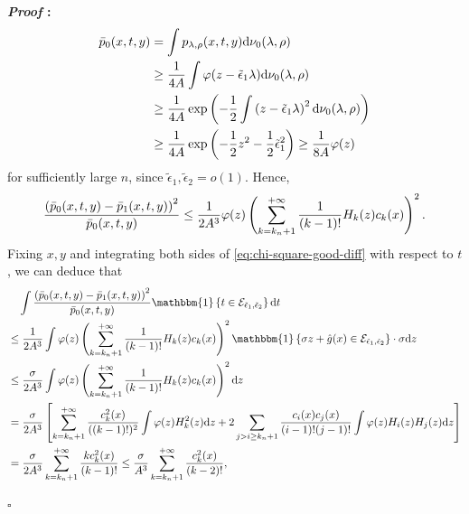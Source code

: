 \documentclass{article}
\def\eps{{\epsilon}}
\def\gE{{\mathcal{E}}}
\newcommand{\dd}{\textup{d}}
\renewenvironment{proof}{\noindent\textbf{\textit{Proof }:}}{\hfill$\square$}
\begin{document}
\begin{proof}
\begin{equation}
        \begin{aligned}
            \bar{p}_0(x,t,y) &= \int 
            p_{\lambda,\rho}(x,t,y) \dd \nu_0(\lambda,\rho) \\
            &\geq \frac{1}{4A} \int \varphi(z-\tilde{\eps}_1\lambda) \dd \nu_0(\lambda,\rho) \\
            &\geq \frac{1}{4A}\exp\left(-\frac{1}{2}\int \left(z-\tilde{\eps}_1\lambda\right)^2 \dd \nu_0(\lambda,\rho)\right) \\
            &\geq \frac{1}{4A}\exp\left(-\frac{1}{2}z^2-\frac{1}{2}\tilde{\eps}_1^2\right) \geq \frac{1}{8A}\varphi(z)
        \end{aligned}
    \end{equation}
    for sufficiently large $n$, since $\tilde{\eps}_1,\tilde{\eps}_2=o(1)$. Hence,
    \begin{equation}
        \notag
        \frac{\left(\bar{p}_0(x,t,y)-\bar{p}_1(x,t,y)\right)^2}{\bar{p}_0(x,t,y)} \leq \frac{1}{2A^3}\varphi(z)\left(\sum_{k=k_n+1}^{+\infty}\frac{1}{(k-1)!}H_k(z)c_k(x)\right)^2.
    \end{equation}
    Fixing $x,y$ and integrating both sides of \eqref{eq:chi-square-good-diff} with respect to $t$, we can deduce that
    \begin{equation}
        \label{eq:chi-square-integrate-t}
        \begin{aligned}
            &\quad \int \frac{\left(\bar{p}_0(x,t,y)-\bar{p}_1(x,t,y)\right)^2}{\bar{p}_0(x,t,y)} \mathbbm{1}\left\{t\in\gE_{\tilde{\eps}_1,\tilde{\eps}_2}\right\} \dd t \\
            &\leq \frac{1}{2A^3} \int \varphi(z) \left(\sum_{k=k_n+1}^{+\infty}\frac{1}{(k-1)!}H_k(z)c_k(x)\right)^2\mathbbm{1}\left\{\sigma z + \hat{g}(x) \in\gE_{\tilde{\eps}_1,\tilde{\eps}_2}\right\}\cdot \sigma\dd z \\
            &\leq \frac{\sigma}{2A^3} \int \varphi(z) \left(\sum_{k=k_n+1}^{+\infty}\frac{1}{(k-1)!}H_k(z)c_k(x)\right)^2 \dd z \\
            &= \frac{\sigma}{2A^3}\left[\sum_{k=k_n+1}^{+\infty}\frac{c_k^2(x)}{((k-1)!)^2}\int\varphi(z)H_k^2(z)\dd z + 2\sum_{j>i\geq k_n+1}\frac{c_i(x)c_j(x)}{(i-1)!(j-1)!} \int \varphi(z)H_i(z)H_j(z)\dd z  \right] \\
            &= \frac{\sigma}{2A^3}\sum_{k=k_n+1}^{+\infty}\frac{k c_k^2(x)}{(k-1)!} \leq \frac{\sigma}{A^3}\sum_{k=k_n+1}^{+\infty}\frac{c_k^2(x)}{(k-2)!} ,
        \end{aligned}
    \end{equation}

\end{proof}
\end{document}
